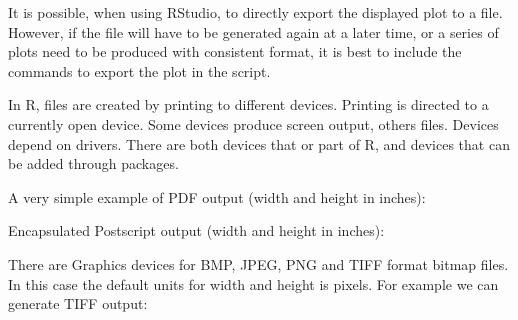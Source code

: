 \documentclass[paper=a4,10pt,div=17,headsepline,BCOR=12mm,twoside,open=right]{scrbook}\usepackage{knitr}
\begin{document}
It is possible, when using RStudio, to directly export the displayed plot to a file. However, if the file will have to be generated again at a later time, or a series of plots need to be produced with consistent format, it is best to include the commands to export the plot in the script.

In R, files are created by printing to different devices. Printing is directed to a currently open device. Some devices produce screen output, others files. Devices depend on drivers. There are both devices that or part of R, and devices that can be added through packages.

A very simple example of PDF output (width and height in inches):

\begin{knitrout}\footnotesize
{}\color{fgcolor}\begin{kframe}
\begin{alltt}
 \hlkwb{<-} \hlstd{(}\hlstd{(}\hlstd{=}\hlopt{-}\hlopt{:}\hlstd{),} \hlstd{(} \hlopt{+}
  \hlstd{(}
\hlstd{(}\hlstd{=}\hlstd{,} \hlstd{=}\hlstd{,} \hlstd{=}\hlstd{)}
\hlstd{()}
\end{alltt}
\end{kframe}
\end{knitrout}

Encapsulated Postscript output (width and height in inches):

\begin{knitrout}\footnotesize
{}\color{fgcolor}\begin{kframe}
\begin{alltt}
\hlstd{(}\hlstd{=}\hlstd{,} \hlstd{=}\hlstd{,} \hlstd{=}\hlstd{)}
\hlstd{()}
\end{alltt}
\end{kframe}
\end{knitrout}

There are Graphics devices for BMP, JPEG, PNG and TIFF format bitmap files. In this case the default units for width and height is pixels. For example we can generate TIFF output:
\end{document}
